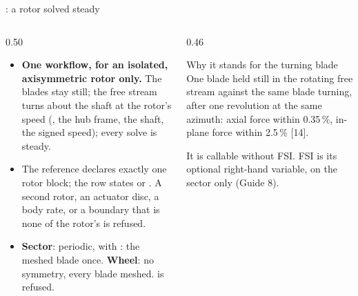 \begin{frame}{: a rotor solved steady}
\begin{columns}[T]
\begin{column}{0.50\textwidth}
\begin{itemize}\small
  \item \textbf{One workflow, for an isolated, axisymmetric rotor only.} The
        blades stay still; the free stream turns about the shaft at the
        rotor's speed (, the hub frame, the
        shaft, the signed speed); every solve is steady.
  \item The reference declares exactly one rotor block; the row states
         or . A second rotor, an actuator disc,
        a body rate, or a boundary that is none of the rotor's is refused.
  \item \textbf{Sector}:  periodic, with
        : the meshed blade once. \textbf{Wheel}: no
        symmetry, every blade meshed.  is refused.
\end{itemize}
\end{column}
\begin{column}{0.46\textwidth}
\begin{block}{Why it stands for the turning blade}
\small One blade held still in the rotating free stream against the same
blade turning, after one revolution at the same azimuth: axial force within
0.35\,\%, in-plane force within 2.5\,\% [14].
\end{block}
\begin{takeaway}It is callable without FSI. FSI is its optional right-hand
variable, on the sector only (Guide 8).\end{takeaway}
\end{column}
\end{columns}
\end{frame}

